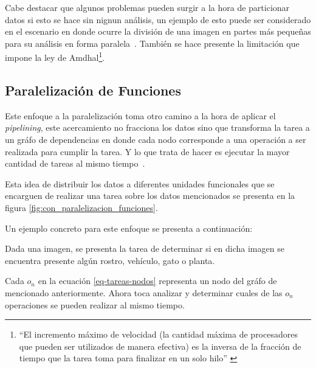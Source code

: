Cabe destacar que algunos problemas pueden surgir a la hora de particionar
datos si esto se hace sin nignun análisis, un ejemplo de esto puede ser
considerado en el escenario en donde ocurre
la división de una imagen en partes más pequeñas para su análisis en forma
paralela~\cite{oshitani1999}. También se hace presente la limitación que impone
la ley de Amdhal\footnote{``El incremento máximo de velocidad (la cantidad máxima de
procesadores que pueden ser utilizados de manera efectiva) es la inversa de la
fracción de tiempo que la tarea toma para finalizar en un solo
hilo'' \cite{rodgers1985}}.
% 

\subsection{Paralelización de Funciones}
\label{ssec:paralelizacion_de_funciones}

\begin{tcolorbox}
  Este enfoque a la paralelización toma otro camino a la hora de aplicar el
  \textit{pipelining}, este acercamiento
  no fracciona los datos sino que transforma la tarea a un gráfo de 
  dependencias en donde cada nodo corresponde a una operación a ser realizada
  para cumplir la tarea. Y lo que trata de hacer es ejecutar la mayor
  cantidad de tareas al mismo tiempo~\cites{meng2013, liu2019, zhou2020,
  lin2021}.
\end{tcolorbox}

Esta idea de distribuir los datos a diferentes unidades funcionales que se
encarguen de realizar una tarea sobre los datos mencionados se presenta en la
figura \ref{fig:con_paralelizacion_funciones}.



Un ejemplo concreto para este enfoque se presenta a continuación:

\begin{tcolorbox}
  Dada una imagen, se presenta la tarea de determinar si en dicha imagen se
  encuentra presente algún rostro, vehículo, gato o planta.
\end{tcolorbox}


\vspace{1cm}

Cada $o_{n}$ en la ecuación \ref{eq-tareas-nodos} representa un nodo del gráfo
de mencionado anteriormente. Ahora toca analizar y determinar
cuales de las $o_{n}$ operaciones se pueden realizar al mismo tiempo.

